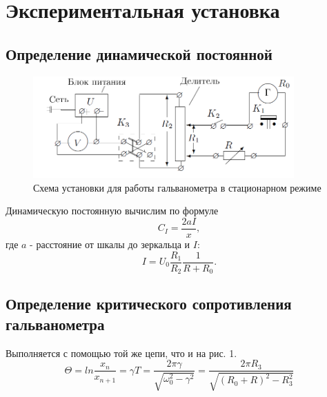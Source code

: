 \documentclass[a4paper]{article}
\begin{document}
\section{Экспериментальная установка}
\subsection{Определение динамической постоянной}
\begin{figure}[H]
    \centering
    \includegraphics[width=10cm]{fig2.PNG}
    \caption{Схема установки для работы гальванометра в стационарном режиме}
    \label{fig:vac}
\end{figure}
Динамическую постоянную вычислим по формуле
\begin{equation}
    C_I = \frac{2aI}{x},
\end{equation}
где $a$ - расстояние от шкалы до зеркальца и $I$:
\begin{equation}
    I = U_0 \frac{R_1}{R_2} \frac{1}{R + R_0}.
\end{equation}

\subsection{Определение критического сопротивления гальванометра}
Выполняется с помощью той же цепи, что и на рис. 1. 
\begin{equation}
    \Theta = ln\frac{x_n}{x_{n+1}} = \gamma T = \frac{2\pi \gamma}{\sqrt{\omega_0^2 - \gamma^2}} = \frac{2\pi R_3}{\sqrt{(R_0 + R)^2 - R_3^2}}
\end{equation}
\end{document}
